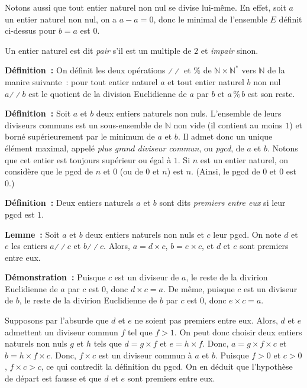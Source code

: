 Notons aussi que tout entier naturel non nul se divise lui-même. 
En effet, soit $a$ un entier naturel non nul, on a $a - a = 0$, donc le minimal de l'ensemble $E$ définit ci-dessus pour $b=a$ est $0$.

Un entier naturel est dit \textit{pair} s'il est un multiple de $2$ et \textit{impair} sinon. 

\bigskip

\noindent\textbf{Définition :} On définit les deux opérations $\divslash\!\divslash$ et $\%$ de $\mathbb{N} \times \mathbb{N}^*$ vers $\mathbb{N}$ de la manire suivante : pour tout entier naturel $a$ et tout entier naturel $b$ non nul $a \mathrel{\divslash\!\divslash} b$ est le quotient de la division Euclidienne de $a$ par $b$ et $a \mathrel{\%} b$ est son reste. 

\bigskip

\noindent\textbf{Définition :} Soit $a$ et $b$ deux entiers naturels non nuls. L'ensemble de leurs diviseurs communs est un sous-ensemble de $\mathbb{N}$ non vide (il contient au moins $1$) et borné supérieurement par le minimum de $a$ et $b$. Il admet donc un unique élément maximal, appelé \textit{plus grand diviseur commun}, ou \textit{pgcd}, de $a$ et $b$. 
    Notons que cet entier est toujours supérieur ou égal à $1$. 
    Si $n$ est un entier naturel, on considère que le pgcd de $n$ et $0$ (ou de $0$ et $n$) est $n$.
    (Ainsi, le pgcd de $0$ et $0$ est $0$.)

\bigskip

\noindent\textbf{Définition :} Deux entiers naturels $a$ et $b$ sont dits \textit{premiers entre eux} si leur pgcd est $1$.

\bigskip

\noindent\textbf{Lemme :} Soit $a$ et $b$ deux entiers naturels non nuls et $c$ leur pgcd.
    On note $d$ et $e$ les entiers $a \mathrel{\divslash\!\divslash} c$ et $b \mathrel{\divslash\!\divslash} c$. 
    Alors, $a = d \times c$, $b = e \times c$, et $d$ et $e$ sont premiers entre eux.

\medskip

\noindent\textbf{Démonstration :} 
    Puisque $c$ est un diviseur de $a$, le reste de la divirion Euclidienne de $a$ par $c$ est $0$, donc $d \times c = a$.
    De même, puisque $c$ est un diviseur de $b$, le reste de la divirion Euclidienne de $b$ par $c$ est $0$, donc $e \times c = a$.

    Supposons par l'absurde que $d$ et $e$ ne soient pas premiers entre eux. 
    Alors, $d$ et $e$ admettent un diviseur commun $f$ tel que $f > 1$.
    On peut donc choisir deux entiers naturels non nuls $g$ et $h$ tels que $d = g \times f$ et $e = h \times f$.
    Donc, $a = g \times f \times c$ et $b = h \times f \times c$. 
    Donc, $f \times c$ est un diviseur commun à $a$ et $b$. 
    Puisque $f > 0$ et $c > 0$, $f \times c > c$, ce qui contredit la définition du pgcd. 
    On en déduit que l'hypothèse de départ est fausse et que $d$ et $e$ sont premiers entre eux. 

